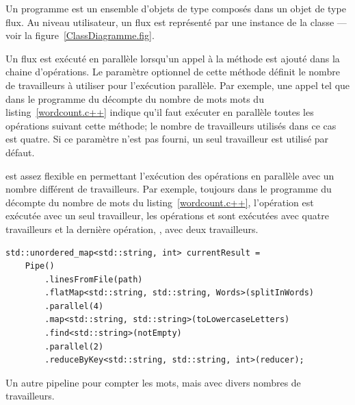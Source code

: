 Un programme \PpFf{} est un ensemble d'objets de type  compos\'es dans un objet de type flux. Au niveau utilisateur, un flux est repr\'esent\'e par une instance de la classe  --- voir la figure~\ref{ClassDiagramme.fig}. 




Un flux est ex\'ecut\'e en parall\`ele lorsqu'un appel \`a la m\'ethode  est ajout\'e dans la chaine d'op\'erations. Le param\`etre optionnel de cette m\'ethode d\'efinit le nombre de travailleurs \`a utiliser pour l'ex\'ecution parall\`ele. Par exemple, une appel tel que  dans le programme du d\'ecompte du nombre de mots mots du listing~\ref{wordcount.c++} indique qu'il faut ex\'ecuter en parall\`ele toutes les op\'erations suivant cette m\'ethode;  le nombre de travailleurs utilis\'es dans ce cas est quatre. Si ce param\`etre n'est pas fourni,  un seul travailleur est utilis\'e par d\'efaut. 


\PpFf{} est assez flexible en permettant l'ex\'ecution des op\'erations en parall\`ele avec un nombre diff\'erent de travailleurs. Par exemple, toujours dans le programme du d\'ecompte du nombre de mots du listing~\ref{wordcount.c++}, l’opération  est exécutée avec un seul travailleur, les opérations  et  sont exécutées avec quatre travailleurs et la dernière opération, , avec deux travailleurs. 




\begin{Listing}[tbp]
\begin{lstlisting}
std::unordered_map<std::string, int> currentResult = 
	Pipe()
		.linesFromFile(path) 
		.flatMap<std::string, std::string, Words>(splitInWords)
		.parallel(4)
		.map<std::string, std::string>(toLowercaseLetters)
		.find<std::string>(notEmpty)
		.parallel(2)
		.reduceByKey<std::string, std::string, int>(reducer);
\end{lstlisting}
\caption{Un autre pipeline pour compter les mots, mais avec divers nombres de travailleurs.}
\label{wordcountParallel.c++}
\end{Listing}

